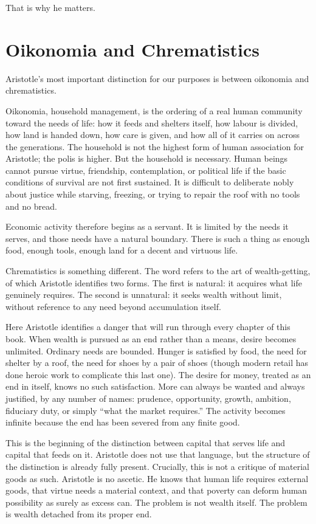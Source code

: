 \documentclass[11pt,a4paper,oneside]{book}
\begin{document}
That is why he matters.

\section*{Oikonomia and Chrematistics}

Aristotle's most important distinction for our purposes is between oikonomia and chrematistics.

Oikonomia, household management, is the ordering of a real human community toward the needs of life: how it feeds and shelters itself, how labour is divided, how land is handed down, how care is given, and how all of it carries on across the generations. The household is not the highest form of human association for Aristotle; the polis is higher. But the household is necessary. Human beings cannot pursue virtue, friendship, contemplation, or political life if the basic conditions of survival are not first sustained. It is difficult to deliberate nobly about justice while starving, freezing, or trying to repair the roof with no tools and no bread.

Economic activity therefore begins as a servant. It is limited by the needs it serves, and those needs have a natural boundary. There is such a thing as enough food, enough tools, enough land for a decent and virtuous life.

Chrematistics is something different. The word refers to the art of wealth-getting, of which Aristotle identifies two forms. The first is natural: it acquires what life genuinely requires. The second is unnatural: it seeks wealth without limit, without reference to any need beyond accumulation itself.

Here Aristotle identifies a danger that will run through every chapter of this book. When wealth is pursued as an end rather than a means, desire becomes unlimited. Ordinary needs are bounded. Hunger is satisfied by food, the need for shelter by a roof, the need for shoes by a pair of shoes (though modern retail has done heroic work to complicate this last one). The desire for money, treated as an end in itself, knows no such satisfaction. More can always be wanted and always justified, by any number of names: prudence, opportunity, growth, ambition, fiduciary duty, or simply ``what the market requires.'' The activity becomes infinite because the end has been severed from any finite good.

This is the beginning of the distinction between capital that serves life and capital that feeds on it. Aristotle does not use that language, but the structure of the distinction is already fully present. Crucially, this is not a critique of material goods as such. Aristotle is no ascetic. He knows that human life requires external goods, that virtue needs a material context, and that poverty can deform human possibility as surely as excess can. The problem is not wealth itself. The problem is wealth detached from its proper end.
\end{document}
